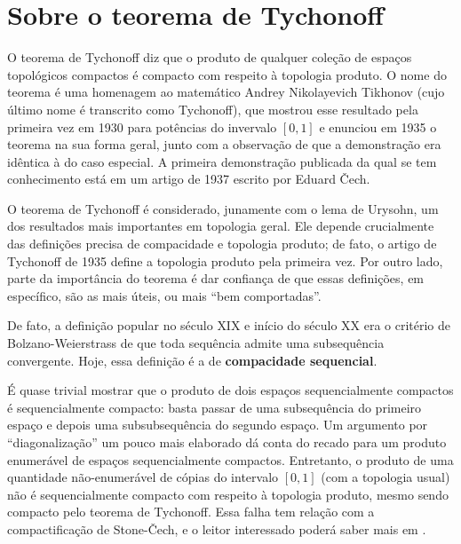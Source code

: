 \section{Sobre o teorema de Tychonoff}

 
 O teorema de Tychonoff diz que o produto de qualquer coleção
 de espaços topológicos compactos é compacto com respeito
 à topologia produto.
 O nome do teorema é uma homenagem ao matemático
 Andrey Nikolayevich Tikhonov 
 (cujo último nome é transcrito como Tychonoff),
 que mostrou esse resultado pela primeira vez em 1930
 para potências do invervalo 
 $[0,1]$
 e enunciou em 1935 o teorema na sua forma geral,
 junto com a observação de que a demonstração era idêntica
 à do caso especial.
 A primeira demonstração publicada da qual se tem conhecimento
 está em um artigo de 1937 escrito por Eduard Čech.
 
 O teorema de Tychonoff é considerado, junamente com o lema de Urysohn, 
 um dos resultados mais importantes em topologia geral.
 Ele depende crucialmente das definições precisa de compacidade
 e topologia produto; de fato, 
 o artigo de Tychonoff de 1935 define a topologia produto pela primeira vez.
 Por outro lado, parte da importância do teorema é dar confiança de que
 essas definições, em específico, são as mais úteis, ou mais
 ``bem comportadas''.
 
 De fato, a definição popular no século XIX e início do século XX era
 o critério de Bolzano-Weierstrass de que toda sequência admite uma
 subsequência convergente. Hoje, essa definição é a de 
 \textbf{compacidade sequencial}.

 É quase trivial mostrar que o produto de dois espaços sequencialmente
 compactos é sequencialmente compacto: basta passar de uma subsequência 
 do primeiro espaço e depois uma subsubsequência do segundo espaço.
 Um argumento por ``diagonalização'' um pouco mais elaborado dá conta
 do recado para um produto enumerável de espaços sequencialmente
 compactos. 
 Entretanto, o produto de uma quantidade não-enumerável de cópias
 do intervalo
 $[0,1]$
 (com a topologia usual) não é sequencialmente compacto com respeito
 à topologia produto, mesmo sendo compacto pelo teorema de Tychonoff.
 Essa falha tem relação com a compactificação de Stone-Čech, e o leitor
 interessado poderá saber mais em \cite{WikiTychonoff}.
 
